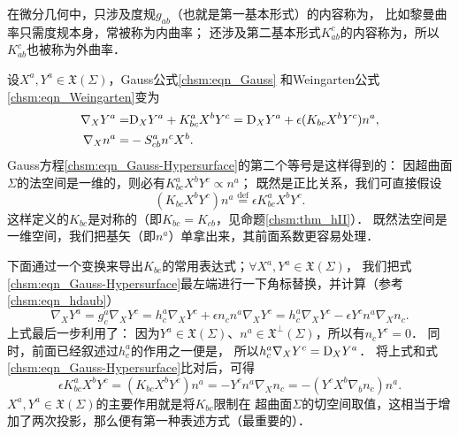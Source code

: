 在微分几何中，只涉及度规$g_{ab}$（也就是第一基本形式）的内容称为，
比如黎曼曲率只需度规本身，常被称为内曲率；
还涉及第二基本形式$K_{ab}^c$的内容称为，所以$K_{ab}^c$也被称为外曲率．

设$X^a, Y^a\in \mathfrak{X}(\Sigma)$，Gauss公式\eqref{chsm:eqn_Gauss}
和Weingarten公式\eqref{chsm:eqn_Weingarten}变为
\begin{align}
    {\nabla}_{X} Y^a =& {\rm D}_{X} Y^a + K^a_{bc}X^b Y^c={\rm D}_{X} Y^a
      + \epsilon (K_{bc} X^b Y^c) {n}^a, \label{chsm:eqn_Gauss-Hypersurface} \\
    {\nabla}_{X} {n}^a =& - S^a_{cb} {n}^c  X^b. \label{chsm:eqn_Weingarten-Hypersurface}
\end{align}
Gauss方程\eqref{chsm:eqn_Gauss-Hypersurface}的第二个等号是这样得到的：
因超曲面$\Sigma$的法空间是一维的，则必有$K^a_{bc} X^b Y^c \propto {n}^a$；
既然是正比关系，我们可直接假设
\begin{equation}\label{chsm:eqn_IIbc}
    (K_{bc} X^b Y^c) {n}^a \overset{\mathrm {def}}{=} \epsilon K^a_{bc} X^b Y^c .
\end{equation}
这样定义的$K_{bc}$是对称的（即$K_{bc}=K_{cb}$，见命题\ref{chsm:thm_hII}）．
既然法空间是一维空间，我们把基矢（即${n}^a$）单拿出来，其前面系数更容易处理．

下面通过一个变换来导出$K_{bc}$的常用表达式；$\forall X^a, Y^a\in \mathfrak{X}(\Sigma)$，
我们把式\eqref{chsm:eqn_Gauss-Hypersurface}最左端进行一下角标替换，并计算（参考\eqref{chsm:eqn_hdaub}）
\begin{equation*}
    \nabla_{X} Y^a = g_{c}^a \nabla_{X} Y^c =
    h_{c}^a\nabla_{X} Y^c +\epsilon {n}_c {n}^a \nabla_{X} Y^c
    = h_{c}^a\nabla_{X} Y^c - \epsilon Y^c {n}^a\nabla_{X}  {n}_c .
\end{equation*}
上式最后一步利用了：
因为$Y^a\in \mathfrak{X}(\Sigma)$、${n}^a\in \mathfrak{X}^\bot(\Sigma)$，所以有${n}_c Y^c=0$．
同时，前面已经叙述过$h_{c}^a$的作用之一便是，
所以$h_{c}^a\nabla_{X} Y^c={\rm D}_{X} Y^a$．
将上式和式\eqref{chsm:eqn_Gauss-Hypersurface}比对后，可得
\begin{equation}\label{chsm:eqn_KabcKab}
     \epsilon K^a_{bc} X^b Y^c =(K_{bc} X^b Y^c) {n}^a =-Y^c {n}^a\nabla_{X}  {n}_c
     =-(Y^c  X^b\nabla_{b} {n}_c ){n}^a .
\end{equation}
$X^a,Y^a\in \mathfrak{X}(\Sigma)$的主要作用就是将$K_{bc}$限制在
超曲面$\Sigma$的切空间取值，这相当于增加了两次投影，那么便有第一种表述方式（最重要的）．


